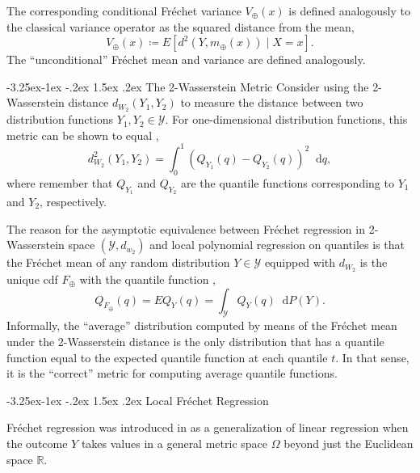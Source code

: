 \documentclass[12pt]{article}
\makeatletter
\renewcommand\subsection{\@startsection{subsection}{2}{\z@}%
  {-3.25ex\@plus -1ex \@minus -.2ex}%
  {1.5ex \@plus .2ex}%
  {\itshape\large\center}} %
\newcommand*\dd{\mathop{}\!\mathrm{d}}
\makeatother
\begin{document}
The corresponding conditional Fr\'echet variance $V_{\oplus}(x)$ is defined analogously to the classical variance operator as the squared distance from the mean, 
\begin{equation*}
    V_{\oplus}(x) \coloneqq E \left[ d^2(Y, m_{\oplus}(x)) \mid X=x \right].
\end{equation*}
The ``unconditional'' Fr\'echet mean and variance are defined analogously. 

\subsection{The 2-Wasserstein Metric}
Consider using the 2-Wasserstein distance $d_{W_2}(Y_1, Y_2)$ to measure the distance between two distribution functions $Y_1, Y_2 \in \mathcal{Y}$. For one-dimensional distribution functions, this metric can be shown to equal \citep[Theorem 2.18]{villani2021topics},  
\begin{equation}
d_{W_2}^2\left(Y_1, Y_2\right)=\int_0^1\left(Q_{Y_1}(q)-Q_{Y_2}(q)\right)^2 \dd q,
\end{equation}
where remember that $Q_{Y_1}$ and $Q_{Y_2}$ are the quantile functions corresponding to $Y_1$ and $Y_2$, respectively. 

The reason for the asymptotic equivalence between Fr\'echet regression in 2-Wasserstein space $(\mathcal{Y}, d_{w_2})$ and local polynomial regression on quantiles is that the Fr\'echet mean of any random distribution $Y \in \mathcal{Y}$ equipped with $d_{W_2}$ is the unique cdf $F_{\oplus}$ with the quantile function \citep[Theorem 3.2.11]{panaretos2020invitation},
\[
Q_{F_\oplus}(q) = E Q_{Y}(q) = \int_{\mathcal{Y}} Q_Y(q) \dd P(Y).
\]
Informally, the ``average'' distribution computed by means of the Fr\'echet mean under the 2-Wasserstein distance is the only distribution that has a quantile function equal to the expected quantile function at each quantile $t$. In that sense, it is the ``correct'' metric for computing average quantile functions. 



\subsection{Local Fr\'echet Regression}

Fr\'echet regression was introduced in \citet{petersen2019frechet} as a generalization of linear regression \citep{fan1996local} when the outcome $Y$ takes values in a general metric space $\Omega$ beyond just the Euclidean space $\mathbb{R}$.
\end{document}

